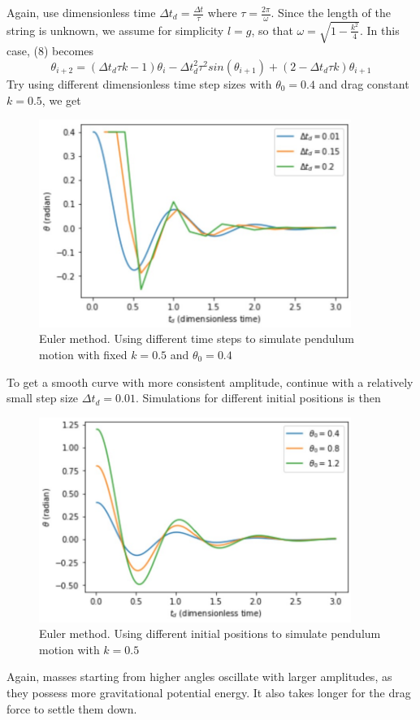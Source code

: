 \documentclass{article}
\begin{document}
Again, use dimensionless time $\Delta t_d=\frac{\Delta t}{\tau}$ where $\tau=\frac{2\pi}{\omega}$. Since the length of the string is unknown, we assume for simplicity $l=g$, so that $\omega=\sqrt{1-\frac{k^2}{4}}$. In this case, (8) becomes
\[\theta_{i+2}=(\Delta t_d \tau k-1)\theta_i-\Delta t_d^2 \tau^2 sin(\theta_{i+1})+(2-\Delta t_d \tau k)\theta_{i+1} \tag{9}\]
Try using different dimensionless time step sizes with $\theta_0=0.4$ and drag constant $k=0.5$, we get
\begin{figure}[H]
\includegraphics[width=4in]{DragEulerDifferentDeltaTd.jpg}
\caption{Euler method. Using different time steps to simulate pendulum motion with fixed $k=0.5$ and $\theta_0=0.4$}
\end{figure}
\noindent To get a smooth curve with more consistent amplitude, continue with a relatively small step size $\Delta t_d=0.01$. Simulations for different initial positions is then 
\begin{figure}[H]
\includegraphics[width=4in]{DragEulerDifferentTheta0.jpg}
\caption{Euler method. Using different initial positions to simulate pendulum motion with $k=0.5$}
\end{figure}
\noindent Again, masses starting from higher angles oscillate with larger amplitudes, as they possess more gravitational potential energy. It also takes longer for the drag force to settle them down.\\
\end{document}
